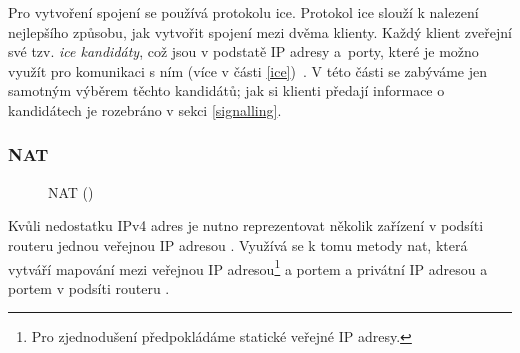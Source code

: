 Pro vytvoření spojení se používá protokolu \gls{ice}. Protokol \gls{ice} slouží
k nalezení nejlepšího způsobu, jak vytvořit spojení mezi dvěma klienty. Každý
klient zveřejní své tzv. \textit{\gls{ice} kandidáty}, což jsou v podstatě IP
adresy a~porty, které je možno využít pro komunikaci s ním (více v části
\ref{ice})~\parencite{WebRTCForTheCurious}. V této části se zabýváme jen
samotným výběrem těchto kandidátů; jak si klienti předají informace o
kandidátech je rozebráno v sekci \ref{signalling}.

\subsubsection{NAT}\label{nat}

\begin{figure}[H]
    \centering
    \caption{NAT (\publicPrivateIP)}
    \label{natFig}
\end{figure}

Kvůli nedostatku IPv4 adres je nutno reprezentovat několik zařízení v podsíti
routeru jednou veřejnou IP adresou \parencite{Medium-NATWHyWeNeedIt}. Využívá se
k tomu metody \gls{nat}, která vytváří mapování mezi veřejnou IP
adresou\footnote{Pro zjednodušení předpokládáme statické veřejné IP adresy.} a
portem a privátní IP adresou a portem v podsíti routeru
\parencite{WebRTCForTheCurious}.


